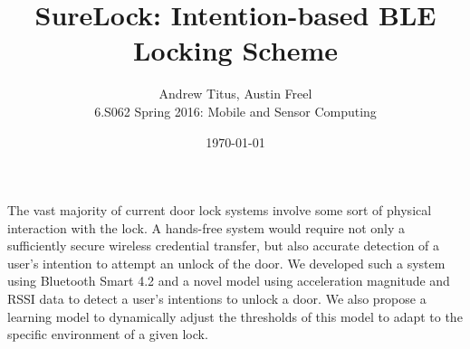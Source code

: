 \documentclass{article}
\title{SureLock: Intention-based BLE Locking Scheme}
\date{\today}
\author{Andrew Titus, Austin Freel \\ 6.S062 Spring 2016: Mobile and Sensor Computing}
\begin{document}
\maketitle

The vast majority of current door lock systems involve some sort of physical interaction
with the lock. A hands-free system would require not only a sufficiently secure wireless
credential transfer, but also accurate detection of a user's intention to attempt an unlock
of the door. We developed such a system using Bluetooth\textsuperscript{\textregistered}
Smart 4.2 and a novel model using acceleration magnitude and RSSI data to detect a user's
intentions to unlock a door. We also propose a learning model to dynamically adjust the
thresholds of this model to adapt to the specific environment of a given lock.
\end{document}
